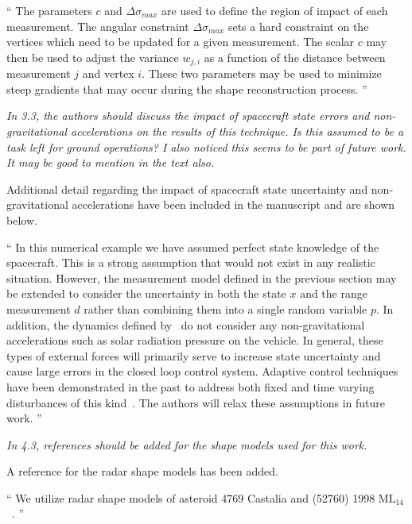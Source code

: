 \documentclass[11pt]{article}
\newenvironment{correction}{\begin{list}{}{\setlength{\leftmargin}{1cm}\setlength{\rightmargin}{1cm}}\vspace{\parsep}\item[]``}{''\end{list}}
\newcommand{\comment}[1]{\item \itshape #1 \normalfont}
\begin{document}
\begin{itemize}
\begin{correction}
    The parameters \( c \) and \( \Delta \sigma_{max} \) are used to define the region of impact of each measurement. 
    The angular constraint \( \Delta \sigma_{max} \) sets a hard constraint on the vertices which need to be updated for a given measurement.
    The scalar \( c \) may then be used to adjust the variance \( w_{j,i} \) as a function of the distance between measurement \( j \) and vertex \( i \).
    These two parameters may be used to minimize steep gradients that may occur during the shape reconstruction process.
\end{correction}

\comment{
In 3.3, the authors should discuss the impact of spacecraft state errors and non-gravitational accelerations on the results of this technique. 
Is this assumed to be a task left for ground operations?
I also noticed this seems to be part of future work. It may be good to mention in the text also.
}

Additional detail regarding the impact of spacecraft state uncertainty and non-gravitational accelerations have been included in the manuscript and are shown below.

\begin{correction}
    In this numerical example we have assumed perfect state knowledge of the spacecraft.
    This is a strong assumption that would not exist in any realistic situation. 
    However, the measurement model defined in the previous section may be extended to consider the uncertainty in both the state \( x \) and the range measurement \( d \) rather than combining them into a single random variable \( p \).
    In addition, the dynamics defined by~ do not consider any non-gravitational accelerations such as solar radiation pressure on the vehicle.
    In general, these types of external forces will primarily serve to increase state uncertainty and cause large errors in the closed loop control system.
    Adaptive control techniques have been demonstrated in the past to address both fixed and time varying disturbances of this kind~\cite{kulumani2017a}.
    The authors will relax these assumptions in future work.
\end{correction}

\comment{
In 4.3, references should be added for the shape models used for this work.}

A reference for the radar shape models has been added.

\begin{correction}
We utilize radar shape models of asteroid \num{4769} Castalia and (\num{52760}) \num{1998} \(\text{ML}_{14}\)~\cite{neese2004}.
\end{correction}


\end{itemize}
\end{document}
